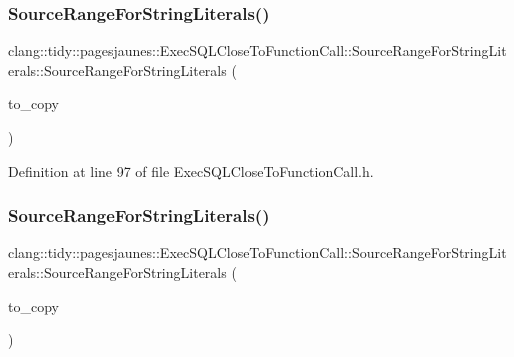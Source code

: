 \subsubsection{\texorpdfstring{Source\+Range\+For\+String\+Literals()}{SourceRangeForStringLiterals()}\hspace{0.1cm}{\footnotesize\ttfamily [5/6]}}
{\footnotesize\ttfamily clang\+::tidy\+::pagesjaunes\+::\+Exec\+S\+Q\+L\+Close\+To\+Function\+Call\+::\+Source\+Range\+For\+String\+Literals\+::\+Source\+Range\+For\+String\+Literals (\begin{DoxyParamCaption}\item[{\hyperlink{classclang_1_1tidy_1_1pagesjaunes_1_1_exec_s_q_l_close_to_function_call_1_1_source_range_for_string_literals}{Source\+Range\+For\+String\+Literals} $\ast$}]{to\+\_\+copy }\end{DoxyParamCaption})\hspace{0.3cm}{\ttfamily [inline]}}



Definition at line 97 of file Exec\+S\+Q\+L\+Close\+To\+Function\+Call.\+h.

\mbox{\label{classclang_1_1tidy_1_1pagesjaunes_1_1_exec_s_q_l_close_to_function_call_1_1_source_range_for_string_literals_ad372bf2c7be2e095013e49e9db750eb8}} 
\subsubsection{\texorpdfstring{Source\+Range\+For\+String\+Literals()}{SourceRangeForStringLiterals()}\hspace{0.1cm}{\footnotesize\ttfamily [6/6]}}
{\footnotesize\ttfamily clang\+::tidy\+::pagesjaunes\+::\+Exec\+S\+Q\+L\+Close\+To\+Function\+Call\+::\+Source\+Range\+For\+String\+Literals\+::\+Source\+Range\+For\+String\+Literals (\begin{DoxyParamCaption}\item[{\hyperlink{classclang_1_1tidy_1_1pagesjaunes_1_1_exec_s_q_l_close_to_function_call_1_1_source_range_for_string_literals}{Source\+Range\+For\+String\+Literals} const $\ast$}]{to\+\_\+copy }\end{DoxyParamCaption})\hspace{0.3cm}{\ttfamily [inline]}}



